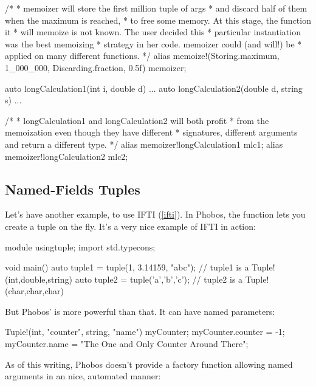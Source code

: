 \begin{dcode}
/*
 * memoizer will store the first million tuple of args
 * and discard half of them when the maximum is reached, 
 * to free some memory. At this stage, the function it 
 * will memoize is not known. The user decided this
 * particular instantiation was the best memoizing 
 * strategy in her code. memoizer could (and will!) be 
 * applied on many different functions.
 */
alias memoize!(Storing.maximum, 1_000_000, Discarding.fraction, 0.5f) memoizer;

auto longCalculation1(int i, double d) { ... }
auto longCalculation2(double d, string s) { ... }

/*
 * longCalculation1 and longCalculation2 will both profit 
 * from the memoization even though they have different 
 * signatures, different arguments and return a different type.
 */
alias memoizer!longCalculation1 mlc1;
alias memoizer!longCalculation2 mlc2;
\end{dcode}


\subsection{Named-Fields Tuples}\label{namedfieldstuples}

Let's have another example, to use IFTI (\ref{ifti}). In Phobos, the function  lets you create a tuple on the fly. It's a very nice example of IFTI in action:

\begin{dcode}
module usingtuple;
import std.typecons;

void main()
{
    auto tuple1 = tuple(1, 3.14159, "abc"); // tuple1 is a Tuple!(int,double,string)
    auto tuple2 = tuple('a','b','c');       // tuple2 is a Tuple!(char,char,char)
}
\end{dcode}

But Phobos'  is more powerful than that. It can have named parameters:

\begin{dcode}
Tuple!(int, "counter", string, "name") myCounter;
myCounter.counter = -1;
myCounter.name = "The One and Only Counter Around There";
\end{dcode}

As of this writing, Phobos doesn't provide a  factory function allowing named arguments in an nice, automated manner:

